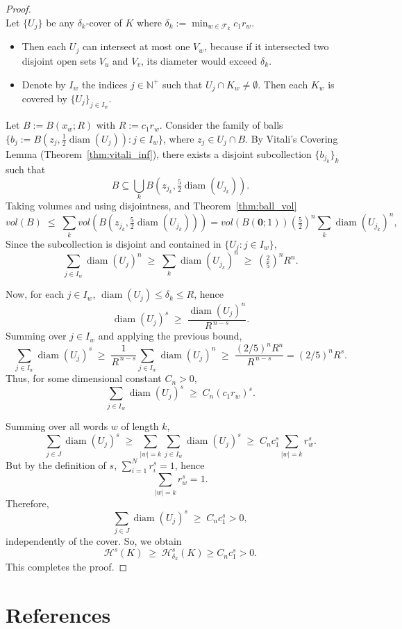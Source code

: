 \documentclass{article}
\theoremstyle{plain}
\theoremstyle{definition}
\DeclareMathOperator{\diam}{diam}
\theoremstyle{remark}
\begin{document}
\begin{proof}
\newpage 
~\\Let $\{U_j\}$ be any $\delta _k$-cover of $K$ where $\delta_k := \min_{w\in\mathcal{F}_k} c_1 r_w$.  
\begin{itemize}
\item[-] Then each $U_j$ can intersect at most one $V_w$, because if it intersected two disjoint open sets $V_u$ and $V_v$, its diameter would exceed $\delta_k$.  
\item[-] Denote by $I_w$ the indices $j \in \mathbb{N}^+$ such that $U_j \cap K_w \neq \emptyset$. Then each $K_w$ is covered by $\{U_j\}_{j \in I_w}$.  
\end{itemize}
Let $B := B(x_w; R)$ with $R := c_1 r_w$. Consider the family of balls $\{b_j := B(z_j, \tfrac12 \diam(U_j)) : j\in I_w\}$, where $z_j \in U_j\cap B$. By Vitali's Covering Lemma (Theorem~\ref{thm:vitali_inf}), there exists a disjoint subcollection $\{b_{j_k}\}_k$ such that
\[
B \subseteq \bigcup_k B\!\left(z_{j_k}, \tfrac52 \diam(U_{j_k})\right).
\]
Taking volumes and using disjointness, and Theorem~\ref{thm:ball_vol}
\[
vol(B) \;\le\; \sum_k vol \!\left(B(z_{j_k}, \tfrac52 \diam(U_{j_k}))\right)
= vol(B(\mathbf{0}; 1)) \left(\tfrac52\right)^n \sum_k \diam(U_{j_k})^n,
\]
Since the subcollection is disjoint and contained in $\{U_j : j\in I_w\}$,
\[
\sum_{j\in I_w} \diam(U_j)^n \;\ge\; \sum_k \diam(U_{j_k})^n \;\ge\; \left(\tfrac25\right)^n R^n.
\]

\medskip
\noindent
Now, for each $j\in I_w$, $\diam(U_j)\le \delta_k \le R$, hence
\[
\diam(U_j)^s \;\ge\; \frac{\diam(U_j)^n}{R^{\,n-s}}.
\]
Summing over $j\in I_w$ and applying the previous bound,
\[
\sum_{j\in I_w} \diam(U_j)^s 
\;\ge\; \frac{1}{R^{\,n-s}} \sum_{j\in I_w} \diam(U_j)^n 
\;\ge\; \frac{(2/5)^n R^n}{R^{\,n-s}} 
= (2/5)^n R^s.
\]
Thus, for some dimensional constant $C_n>0$,
\[
\sum_{j\in I_w} \diam(U_j)^s \;\ge\; C_n (c_1 r_w)^s.
\]

\medskip
\noindent
Summing over all words $w$ of length $k$,
\[
\sum_{j\in J} \diam(U_j)^s 
\;\ge\; \sum_{|w|=k} \sum_{j\in I_w} \diam(U_j)^s 
\;\ge\; C_n c_1^s \sum_{|w|=k} r_w^s.
\]
But by the definition of $s$, $\sum_{i=1}^N r_i^s=1$, hence
\[
\sum_{|w|=k} r_w^s = 1.
\]
Therefore,
\[
\sum_{j\in J} \diam(U_j)^s \;\ge\; C_n c_1^s > 0,
\]
independently of the cover. So, we obtain
\[
\mathcal{H}^s(K) \;\ge\; \mathcal{H}^s_{\delta_k} (K) \ge C_n c_1^s > 0.
\]
This completes the proof.
\end{proof}

\newpage


\section{References}
\end{document}
